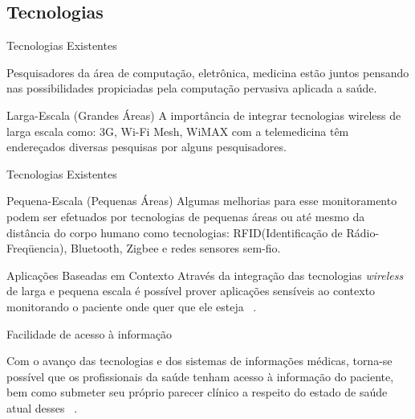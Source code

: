 \documentclass{beamer}
\begin{document}


\subsection{Tecnologias}
\begin{frame}{Tecnologias Existentes}
  \begin{block}{}
  Pesquisadores da área de computação, eletrônica, medicina estão juntos pensando nas possibilidades propiciadas pela computação pervasiva aplicada a saúde. 
  \end{block}

  \begin{block}{Larga-Escala (Grandes Áreas)}
  A importância de integrar tecnologias wireless de larga escala como: 3G, Wi-Fi Mesh, WiMAX com a telemedicina têm endereçados diversas pesquisas por alguns pesquisadores.
  \end{block}  
\end{frame}

\begin{frame}{Tecnologias Existentes}
  \begin{block}{Pequena-Escala (Pequenas Áreas)}
   Algumas melhorias para esse monitoramento podem ser efetuados por tecnologias de pequenas áreas ou até mesmo da distância do corpo humano como tecnologias: RFID(Identificação de Rádio-Freqüencia), Bluetooth, Zigbee e redes sensores sem-fio.
  \end{block}

  \begin{block}{Aplicações Baseadas em Contexto}
  Através da integração das tecnologias \textit{wireless} de larga e pequena escala é possível prover aplicações sensíveis ao contexto monitorando o paciente onde quer que ele esteja ~\cite{witeleme}.
  \end{block}  
\end{frame}

\begin{frame}{Facilidade de acesso à informação}
    \begin{block}{}
     Com o avanço das tecnologias e dos sistemas de informações médicas, torna-se possível que os profissionais da saúde tenham acesso à informação do paciente, bem como submeter seu próprio parecer clínico a respeito do estado de saúde atual desses ~\cite{mug03}. 
    \end{block} 
\end{frame}
\end{document}
